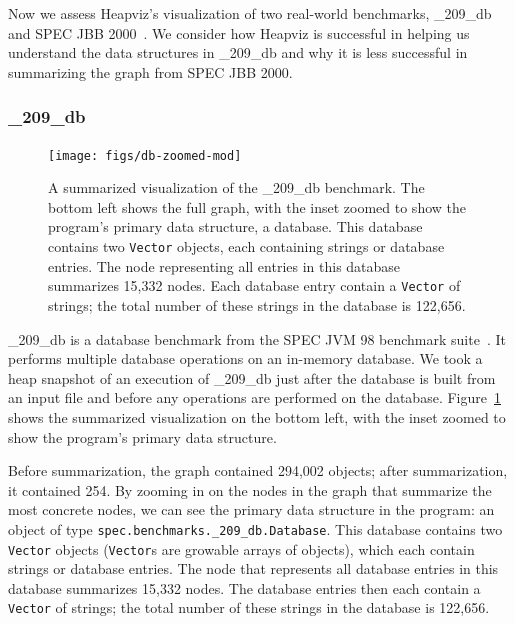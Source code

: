 Now we assess Heapviz's visualization of two real-world benchmarks,
\_209\_db~\cite{specjvm98} and SPEC JBB 2000~\cite{specjbb2000}.  We
consider how Heapviz is successful in helping us understand the data structures
in \_209\_db and why it is less successful in summarizing the graph from SPEC
JBB 2000.

\subsubsection{\_209\_db}


\begin{figure}[t]
  \texttt{[image: figs/db-zoomed-mod]}
  \caption{A summarized visualization of the \_209\_db benchmark.  The 
bottom left shows the full graph, with the inset zoomed to 
show the program's primary data structure, a database.
This database contains two \texttt{Vector} objects, each containing 
strings or database entries. The node representing all entries in this 
database summarizes 15,332 nodes. Each database entry contain a 
\texttt{Vector} of strings; the total number of these strings in the 
database is 122,656.
}
  \label{fig:db-zoomed}
\end{figure}

\_209\_db is a database benchmark from the SPEC JVM 98 benchmark
suite~\cite{specjvm98}.  It performs multiple database operations on an
in-memory database.  We took a heap snapshot of an execution of \_209\_db just
after the database is built from an input file and before any operations are
performed on the database.  Figure~\ref{fig:db-zoomed} shows the summarized
visualization on the bottom left, with the inset zoomed to show the program's
primary data structure.

Before summarization, the graph contained 294,002 objects; after 
summarization, it contained 254.  By zooming in on the nodes in the 
graph that summarize the most concrete
nodes,  we can see the primary data structure
in the program: an object of type \texttt{spec.benchmarks.\_209\_db.Database}.
This database contains two \texttt{Vector} objects (\texttt{Vector}s
are growable arrays of objects), which each contain 
strings or database entries.  The node that represents all database entries
in this database summarizes 15,332 nodes.  The database entries then each
contain a \texttt{Vector} of strings; the total number of these strings 
in the database is 122,656.  

